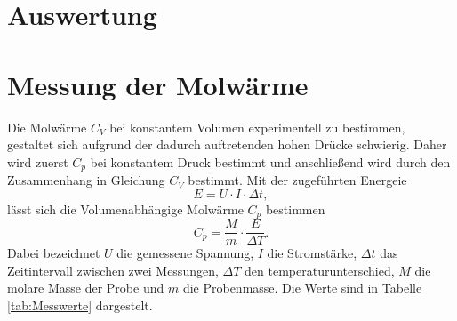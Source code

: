\section{Auswertung}
\label{sec:Auswertung}
\section{Messung der Molwärme}

Die Molwärme $C_V$ bei konstantem Volumen experimentell zu bestimmen,
gestaltet sich aufgrund der dadurch auftretenden hohen Drücke schwierig.
Daher wird zuerst $C_p$ bei konstantem Druck bestimmt 
und anschließend wird durch den Zusammenhang in Gleichung  $C_V$ bestimmt.
Mit der zugeführten Energeie
\begin{equation*}
    E = U\cdot I \cdot \Delta t,
\end{equation*}
lässt sich die Volumenabhängige Molwärme $C_p$ bestimmen
\begin{equation*}
    C_p = \frac{M}{m} \cdot \frac{E}{\Delta T}.
\end{equation*}
Dabei bezeichnet $U$ die gemessene Spannung,
$I$ die Stromstärke, 
$\Delta t$ das Zeitintervall zwischen zwei Messungen,
$\Delta T$ den temperaturunterschied,
$M$ die molare Masse der Probe und
$m$ die Probenmasse.
Die  Werte sind in Tabelle \eqref{tab:Messwerte} dargestelt.


